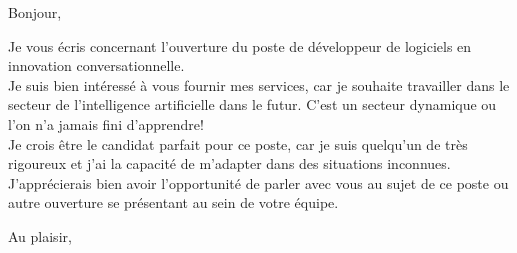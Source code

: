 \documentclass[12pt,french]{letter}
\begin{document}

\begin{letter}{}
\address{Montréal, Canada}

\opening{Bonjour,}


Je vous écris concernant l'ouverture du poste de développeur de logiciels en innovation conversationnelle.\\
Je suis bien intéressé à vous fournir mes services, car je souhaite travailler dans le secteur de l'intelligence artificielle dans le futur. C'est un secteur dynamique ou l'on n’a jamais fini d'apprendre! \\
Je crois être le candidat parfait pour ce poste, car je suis quelqu'un de très rigoureux et j'ai la capacité de m'adapter dans des situations inconnues.\\
J'apprécierais bien avoir l'opportunité de parler avec vous au sujet de ce poste ou autre ouverture se présentant au sein de votre équipe.
\signature{Maxime}

\closing{Au plaisir,}


\end{letter}
\end{document}
